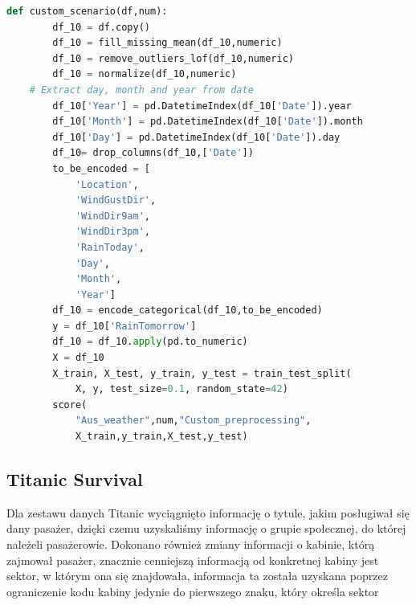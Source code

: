 \documentclass{book}
\begin{document}
\begin{lstlisting}[language=Python, caption={Indywidualny 
    scenariusz dla zestawu danych Aus Rain Forecast}, captionpos=b]
    def custom_scenario(df,num):
        df_10 = df.copy()
        df_10 = fill_missing_mean(df_10,numeric)
        df_10 = remove_outliers_lof(df_10,numeric)
        df_10 = normalize(df_10,numeric)
    # Extract day, month and year from date
        df_10['Year'] = pd.DatetimeIndex(df_10['Date']).year
        df_10['Month'] = pd.DatetimeIndex(df_10['Date']).month
        df_10['Day'] = pd.DatetimeIndex(df_10['Date']).day
        df_10= drop_columns(df_10,['Date'])
        to_be_encoded = [
            'Location',
            'WindGustDir',
            'WindDir9am',
            'WindDir3pm',
            'RainToday',
            'Day',
            'Month',
            'Year']
        df_10 = encode_categorical(df_10,to_be_encoded)
        y = df_10['RainTomorrow']
        df_10 = df_10.apply(pd.to_numeric)
        X = df_10
        X_train, X_test, y_train, y_test = train_test_split(
            X, y, test_size=0.1, random_state=42)
        score(
            "Aus_weather",num,"Custom_preprocessing",
            X_train,y_train,X_test,y_test)
\end{lstlisting}

\subsection{Titanic Survival}
Dla zestawu danych Titanic wyciągnięto informację o tytule, 
jakim posługiwał się dany pasażer, dzięki czemu uzyskaliśmy 
informację o grupie społecznej, do której należeli pasażerowie. 
Dokonano również zmiany informacji o kabinie, którą zajmował pasażer, 
znacznie cenniejszą informacją od konkretnej kabiny jest sektor, 
w którym ona się znajdowała, informacja ta została uzyskana poprzez 
ograniczenie kodu kabiny jedynie do pierwszego znaku, który 
określa sektor
\end{document}
